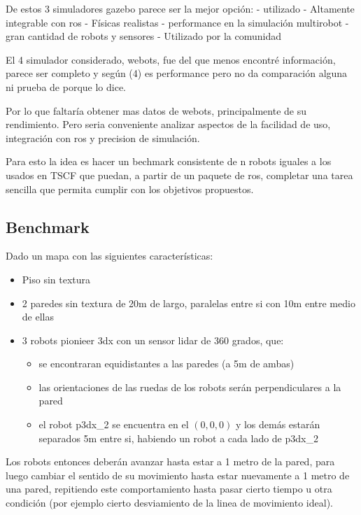 De estos 3 simuladores gazebo parece ser la mejor opción:
  - utilizado
  - Altamente integrable con ros
  - Físicas realistas
  - performance en la simulación multirobot
  - gran cantidad de robots y sensores
  - Utilizado por la comunidad

El 4 simulador considerado, webots, fue del que menos encontré información, parece ser completo y según (4) es performance pero no da comparación alguna ni prueba de porque lo dice. 

Por lo que faltaría obtener mas datos de webots, principalmente de su rendimiento. Pero seria conveniente analizar aspectos de la facilidad de uso, integración con ros y precision de simulación.

Para esto la idea es hacer un bechmark consistente de n robots iguales a los usados en TSCF que puedan, a partir de un paquete de ros, completar una tarea sencilla que permita cumplir con los objetivos propuestos.

\subsection{Benchmark}
Dado un mapa con las siguientes características:
\begin{itemize}
  \item Piso sin textura
  \item 2 paredes sin textura de 20m de largo, paralelas entre si con 10m entre medio de ellas
  \item 3 robots pionieer 3dx con un sensor lidar de 360 grados, que:
  \begin{itemize}
      \item se encontraran equidistantes a las paredes (a 5m de ambas)
      \item las orientaciones de las ruedas de los robots serán perpendiculares a la pared
      \item el robot p3dx\_2 se encuentra en el $(0,0,0)$ y los demás estarán separados 5m entre si, habiendo un robot a cada lado de p3dx\_2  
  \end{itemize}
\end{itemize}

Los robots entonces deberán avanzar hasta estar a 1 metro de la pared, para luego cambiar el sentido de su movimiento hasta estar nuevamente a 1 metro de una pared, repitiendo este comportamiento hasta pasar cierto tiempo u otra condición (por ejemplo cierto desviamiento de la linea de movimiento ideal).

